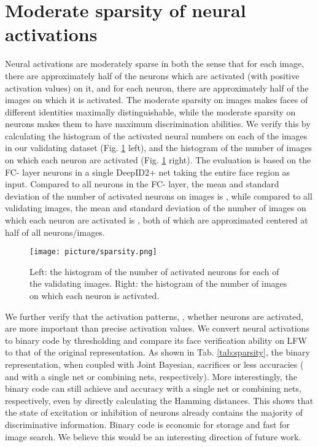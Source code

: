 \documentclass[10pt,twocolumn,letterpaper]{article}
\begin{document}
\section{Moderate sparsity of neural activations}

Neural activations are moderately sparse in both the sense that for each image, there are approximately half of the neurons which are activated (with positive activation values) on it, and for each neuron, there are approximately half of the images on which it is activated. The moderate sparsity on images makes faces of different identities maximally distinguishable, while the moderate sparsity on neurons makes them to have maximum discrimination abilities. We verify this by calculating the histogram of the activated neural numbers on each of the  images in our validating dataset (Fig. \ref{fig:sparsity} left), and the histogram of the number of images on which each neuron are activated (Fig. \ref{fig:sparsity} right). The evaluation is based on the FC- layer neurons in a single DeepID2+ net taking the entire face region as input. Compared to all  neurons in the FC- layer, the mean and standard deviation of the number of activated neurons on images is , while compared to all  validating images, the mean and standard deviation of the number of images on which each neuron are activated is , both of which are approximated centered at half of all neurons/images.

\begin{figure}[!h]
\begin{center}
\texttt{[image: picture/sparsity.png]}
\end{center}
\vspace{-0.15in}
\caption{Left: the histogram of the number of activated neurons for each of the validating images. Right: the histogram of the number of images on which each neuron is activated.}
\label{fig:sparsity}
\vspace{-0.05in}
\end{figure}

We further verify that the activation patterns, \ie, whether neurons are activated, are more important than precise activation values. We convert neural activations to binary code by thresholding and compare its face verification ability on LFW to that of the original representation. As shown in Tab. \ref{tab:sparsity}, the binary representation, when coupled with Joint Bayesian, sacrifices  or less accuracies ( and  with a single net or combining  nets, respectively). More interestingly, the binary code can still achieve  and  accuracy with a single net or combining  nets, respectively, even by directly calculating the Hamming distances. This shows that the state of excitation or inhibition of neurons already contains the majority of discriminative information. Binary code is economic for storage and fast for image search. We believe this would be an interesting direction of future work.
\end{document}
